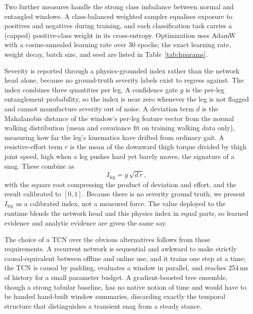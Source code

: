 Two further measures handle the strong class imbalance between normal and entangled windows. A class-balanced weighted sampler equalises exposure to positives and negatives during training, and each classification task carries a (capped) positive-class weight in its cross-entropy. Optimization uses AdamW \cite{loshchilov2019adamw} with a cosine-annealed learning rate over 30 epochs; the exact learning rate, weight decay, batch size, and seed are listed in Table~\ref{tab:hparams}.

Severity is reported through a physics-grounded index rather than the network head alone, because no ground-truth severity labels exist to regress against. The index combines three quantities per leg. A confidence gate $g$ is the per-leg entanglement probability, so the index is near zero whenever the leg is not flagged and cannot manufacture severity out of noise. A deviation term $d$ is the Mahalanobis distance of the window's per-leg feature vector from the normal walking distribution (mean and covariance fit on training walking data only), measuring how far the leg's kinematics have drifted from ordinary gait. A resistive-effort term $r$ is the mean of the downward thigh torque divided by thigh joint speed, high when a leg pushes hard yet barely moves, the signature of a snag. These combine as
\begin{equation}
I_{\text{leg}} = g\,\sqrt{d\,r},
\end{equation}
with the square root compressing the product of deviation and effort, and the result calibrated to $[0,1]$. Because there is no severity ground truth, we present $I_{\text{leg}}$ as a calibrated index, not a measured force. The value deployed to the runtime blends the network head and this physics index in equal parts, so learned evidence and analytic evidence are given the same say.

The choice of a TCN over the obvious alternatives follows from these requirements. A recurrent network is sequential and awkward to make strictly causal-equivalent between offline and online use, and it trains one step at a time; the TCN is causal by padding, evaluates a window in parallel, and reaches 254\,ms of history for a small parameter budget. A gradient-boosted tree ensemble, though a strong tabular baseline, has no native notion of time and would have to be handed hand-built window summaries, discarding exactly the temporal structure that distinguishes a transient snag from a steady stance.